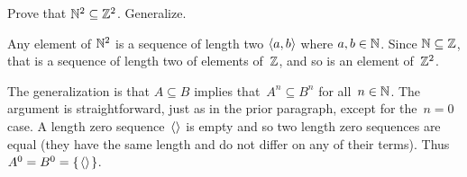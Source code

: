 \documentclass{ibl}  %
\begin{document}
\begin{problem}
Prove that $\mathbb{N}^2\subseteq \mathbb{Z}^2$.
Generalize. 
\begin{answer}
Any element of $\mathbb{N}^2$ is a sequence of length two $\langle a,b\rangle$ where
$a,b\in\mathbb{N}$.
Since $\mathbb{N}\subseteq\mathbb{Z}$, that is a sequence of length two of elements of~$\mathbb{Z}$, 
and so is an element of~$\mathbb{Z}^2$.

The generalization is that $A\subseteq B$ implies that~$A^n\subseteq B^n$ 
for all~$n\in\mathbb{N}$.
The argument is straightforward, just as in the prior paragraph,
except for the~$n=0$ case.
A length zero sequence~$\langle\rangle$ is empty and so two 
length zero sequences are equal (they have the same length and do not 
differ on any of their terms).
Thus $A^0=B^0=\mbox{$\{\hspace{0.1em}\langle\rangle\hspace{0.1em}\}$}$.
\end{answer}
\end{problem}
\end{document}
